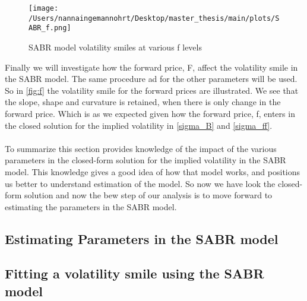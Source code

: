 \begin{figure}[htbp]
    \centering
    \texttt{[image: /Users/nannaingemannohrt/Desktop/master\_thesis/main/plots/SABR\_f.png]}
    \caption{SABR model volatility smiles at various f levels}
    \label{fig:f}
\end{figure}
\newpage
\noindent
Finally we will investigate how the forward price, F, affect the volatility smile in the SABR model. 
The same procedure ad for the other parameters will be used. So in \autoref{fig:f} the volatility smile
for the forward prices are illustrated. We see that the slope, shape and curvature is retained, when there
is only change in the forward price. Which is as we expected given how the forward price, f, enters in the closed
solution for the implied volatility in \autoref{sigma_B} and \autoref{sigma_ff}.
\\\\
To summarize this section provides knowledge of the impact of the various parameters in the closed-form solution
for the implied volatility in the SABR model. This knowledge gives a good idea of how that model works, and 
positions us better to understand estimation of the model. So now we have look the closed-form solution and 
now the bew step of our analysis is to move forward to estimating the parameters in the SABR model.
\newpage
\subsection{Estimating Parameters in the SABR model}
\subsection{Fitting a volatility smile using the SABR model}